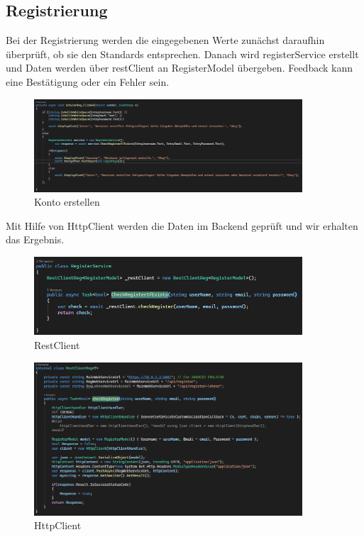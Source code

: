 \subsection{Registrierung}
Bei der Registrierung werden die eingegebenen Werte zunächst daraufhin überprüft, ob sie den Standards entsprechen. Danach wird registerService erstellt und Daten werden über restClient an RegisterModel übergeben. Feedback kann eine Bestätigung oder ein Fehler sein.
\begin{figure}[h]
    \begin{center}\includegraphics[width=10cm]{pics/Xamarin Frontend/6.png}
    \caption[Registrierung]{Konto erstellen}
    \end{center}
\end{figure}
\newline
Mit Hilfe von HttpClient werden die Daten im Backend geprüft und wir erhalten das Ergebnis.
\begin{figure}[h]
    \begin{center}\includegraphics[width=10cm]{pics/Xamarin Frontend/7.png}
    \caption[Registrierung]{RestClient}
    \end{center}
\end{figure}
\newline
\begin{figure}[h]
    \begin{center}\includegraphics[width=10cm]{pics/Xamarin Frontend/8.png}
    \caption[Registrierung]{HttpClient}
    \end{center}
\end{figure}
\newpage

